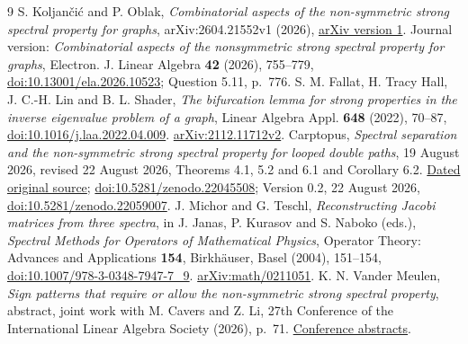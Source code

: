 \documentclass[11pt]{article}
\begin{document}
\begin{thebibliography}{9}
S. Koljan\v{c}i\'c and P. Oblak,
\emph{Combinatorial aspects of the non-symmetric strong spectral
property for graphs}, arXiv:2604.21552v1 (2026),
\href{https://arxiv.org/abs/2604.21552v1}{arXiv version 1}.
Journal version: \emph{Combinatorial aspects of the nonsymmetric strong
spectral property for graphs}, Electron. J. Linear Algebra \textbf{42}
(2026), 755--779,
\href{https://doi.org/10.13001/ela.2026.10523}{doi:10.13001/ela.2026.10523};
Question 5.11, p.~776.
S. M. Fallat, H. Tracy Hall, J. C.-H. Lin and B. L. Shader,
\emph{The bifurcation lemma for strong properties in the inverse
eigenvalue problem of a graph}, Linear Algebra Appl. \textbf{648}
(2022), 70--87,
\href{https://doi.org/10.1016/j.laa.2022.04.009}{doi:10.1016/j.laa.2022.04.009}.
\href{https://arxiv.org/abs/2112.11712v2}{arXiv:2112.11712v2}.
Carptopus,
\emph{Spectral separation and the non-symmetric strong spectral property
for looped double paths}, 19 August 2026, revised 22 August 2026,
Theorems 4.1, 5.2 and 6.1 and Corollary 6.2.
\href{https://raw.githubusercontent.com/Carptopus/MathExplore-Notes/e57ee007380cbc351eb371d8e991303cab5f1e48/research/nssp-looped-double-paths/nssp-looped-double-paths.tex}{Dated original source};
\href{https://doi.org/10.5281/zenodo.22045508}{doi:10.5281/zenodo.22045508};
Version 0.2, 22 August 2026,
\href{https://doi.org/10.5281/zenodo.22059007}{doi:10.5281/zenodo.22059007}.
J. Michor and G. Teschl,
\emph{Reconstructing Jacobi matrices from three spectra},
in J. Janas, P. Kurasov and S. Naboko (eds.),
\emph{Spectral Methods for Operators of Mathematical Physics},
Operator Theory: Advances and Applications \textbf{154},
Birkh\"auser, Basel (2004), 151--154,
\href{https://doi.org/10.1007/978-3-0348-7947-7_9}{doi:10.1007/978-3-0348-7947-7\_9}.
\href{https://arxiv.org/abs/math/0211051}{arXiv:math/0211051}.
K. N. Vander Meulen,
\emph{Sign patterns that require or allow the non-symmetric strong
spectral property}, abstract, joint work with M. Cavers and Z. Li,
27th Conference of the International Linear Algebra Society (2026), p.~71.
\href{https://ilas2026.math.vt.edu/docs/ILAS2026-Book-Of-Abstracts.pdf}{Conference abstracts}.
\end{thebibliography}
\end{document}
